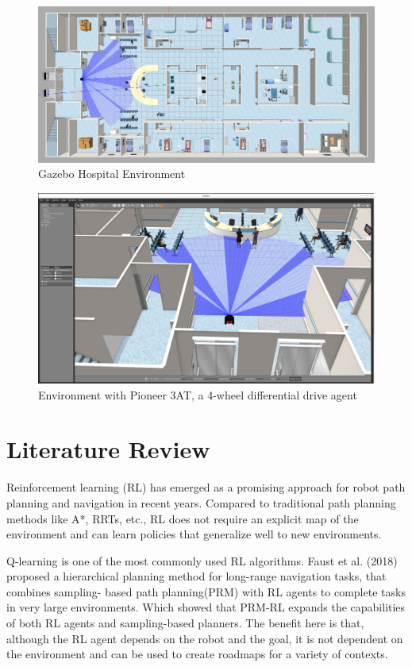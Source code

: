 \documentclass[conference]{IEEEtran}
\begin{document}
\begin{figure}[!htb]
\centering
\includegraphics[width=0.8\columnwidth,keepaspectratio]{env.png}
\caption{Gazebo Hospital Environment }
\label{fig:your_label}
\end{figure}
\begin{figure}[!htb]
\centering
\includegraphics[width=0.8\columnwidth,keepaspectratio]{agent.png}
\caption{Environment with Pioneer 3AT, a 4-wheel differential drive agent}
\label{fig:your_label}
\end{figure}




\section{Literature Review}
Reinforcement learning (RL) has emerged as a promising approach for robot path planning and navigation in recent years. Compared to traditional path planning methods like A*, RRTs, etc., RL does not require an explicit map of the environment and can learn policies that generalize well to new environments.\par
    Q-learning is one of the most commonly used RL algorithms. Faust et al. (2018)\cite{faust2018prm} proposed a hierarchical planning method for long-range navigation tasks, that combines sampling- based path planning(PRM) with RL agents to complete tasks in very large environments. Which showed that PRM-RL expands the capabilities of both RL agents and sampling-based planners. The benefit here is that, although the RL agent depends on the robot and the goal, it is not dependent on the environment and can be used to create roadmaps for a variety of contexts.\par 
\end{document}
